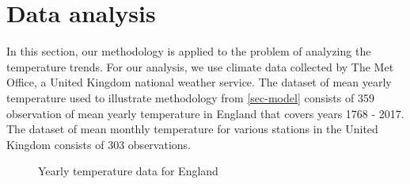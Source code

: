 \newpage
\section{Data analysis}
In this section, our methodology is applied to the problem of analyzing the temperature trends. For our analysis, we use climate data collected by The Met Office, a United Kingdom national weather service. The dataset of mean yearly temperature used to illustrate methodology from \ref{sec-model} consists of 359 observation of mean yearly temperature in England that covers years 1768 - 2017. The dataset of mean monthly temperature for various stations in the United Kingdom consists of 303 observations. 

\begin{figure}[ht!]
\centering

\caption{Yearly temperature data for England\label{yearly_data}}
\end{figure}


